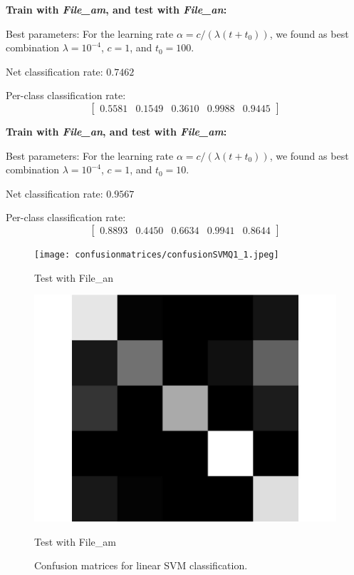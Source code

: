 \documentclass[letterpaper]{article}
\begin{document}
\textbf{Train with \textit{File\_am}, and test with \textit{File\_an}:}

Best parameters: For the learning rate $\alpha = c/(\lambda(t + t_0))$,
we found as best combination $\lambda = 10^{-4}$, $c = 1$, and $t_0 = 100$.

Net classification rate: $0.7462$

Per-class classification rate: 
\[
\begin{bmatrix} 0.5581 & 0.1549 & 0.3610 & 0.9988 & 0.9445\end{bmatrix}
\]

\textbf{Train with \textit{File\_an}, and test with \textit{File\_am}:}

Best parameters: For the learning rate $\alpha = c/(\lambda(t + t_0))$,
we found as best combination $\lambda = 10^{-4}$, $c = 1$, and $t_0 = 10$.

Net classification rate: $0.9567$

Per-class classification rate: 
\[
\begin{bmatrix}
0.8893    & 0.4450    & 0.6634    & 0.9941    & 0.8644
\end{bmatrix}
\]


\begin{figure}
\begin{minipage}{.45\linewidth}
   \texttt{[image: confusionmatrices/confusionSVMQ1\_1.jpeg]}
   \small\centerline{Test with File\_an}\normalsize
   \end{minipage}
\begin{minipage}{.45\linewidth}
   \includegraphics[width=\linewidth]{confusionmatrices/confusionSVMQ1_2.png}
   \small\centerline{Test with File\_am}\normalsize
   \end{minipage}
   \caption{Confusion matrices for linear SVM classification.}
\end{figure}
\end{document}
